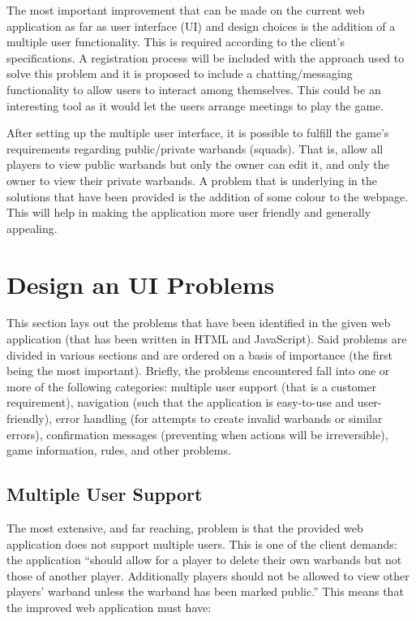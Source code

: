 \documentclass[12pt,a4paper]{article}
\begin{document}
The most important improvement that can be made on the current web application as far as user interface (UI) and design choices is the addition of a multiple user functionality. This is required according to the client's specifications. A registration process will be included with the approach used to solve this problem and it is proposed to include a chatting/messaging functionality to allow users to interact among themselves. This could be an interesting tool as it would let the users arrange meetings to play the game.

After setting up the multiple user interface, it is possible to fulfill the game's requirements regarding public/private warbands (squads). That is, allow all players to view public warbands but only the owner can edit it, and only the owner to view their private warbands. A problem that is underlying in the solutions that have been provided is the addition of some colour to the webpage. This will help in making the application more user friendly and generally appealing.

\section{Design an UI Problems}
\label{sec:concept}

This section lays out the problems that have been identified in the given web application (that has been written in HTML and JavaScript). Said problems are divided in various sections and are ordered on a basis of importance (the first being the most important). Briefly, the problems encountered fall into one or more of the following categories: multiple user support (that is a customer requirement), navigation (such that the application is easy-to-use and user-friendly), error handling (for attempts to create invalid warbands or similar errors), confirmation messages (preventing when actions will be irreversible), game information, rules, and other problems. 

\subsection{Multiple User Support}

The most extensive, and far reaching, problem is that the provided web application does not support multiple users. This is one of the client demands: the application ``should allow for a player to delete their own warbands but not those of another player. Additionally players should not be allowed to view other players' warband unless the warband has been marked public.'' This means that the improved web application must have:
\end{document}
